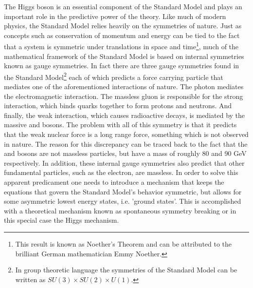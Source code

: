 The Higgs boson is an essential component of the Standard Model and plays
an important role in the predictive power of the theory. Like much of modern
physics, the Standard Model relies heavily on the symmetries of nature. Just
as concepts such as conservation of momentum and energy can be tied to the 
fact that a system is symmetric under translations in space and time\footnote{
This result is known as Noether's Theorem and can be attributed to the 
brilliant German mathematician Emmy Noether.}, much of the mathematical 
framework of the Standard Model is based on internal symmetries 
known as gauge symmetries. In fact there are three gauge symmetries found
in the Standard Model\footnote{ In group theoretic language the symmetries of
the Standard Model can be written as $SU(3) \times SU(2) \times U(1)$.} 
each of which predicts a force carrying particle that mediates one of the 
aforementioned interactions of nature. The photon mediates the 
electromagnetic interaction. The massless gluon is responsible for the strong 
interaction, which binds quarks together to form protons and neutrons.
And finally, the weak interaction, which causes radioactive decays, 
is mediated by the massive \WBosons and \ZBoson bosons. The problem with all 
of this symmetry is that it predicts that the weak nuclear force is a long
range force, something which is not observed in nature. The reason for this
discrepancy can be traced back to the fact that the \WBoson and \ZBoson bosons are
not massless particles, but have a mass of roughly 80 and 90 GeV respectively. 
In addition, these internal gauge symmetries also predict that other 
fundamental particles, such as the electron, are massless. In order to solve
this apparent predicament one needs to introduce a mechanism that keeps the
equations that govern the Standard Model's behavior symmetric, but allows for
some asymmetric lowest energy states, i.e. 'ground states'. 
This is accomplished with a theoretical mechanism known as spontaneous
symmetry breaking or in this special case the Higgs mechanism.


